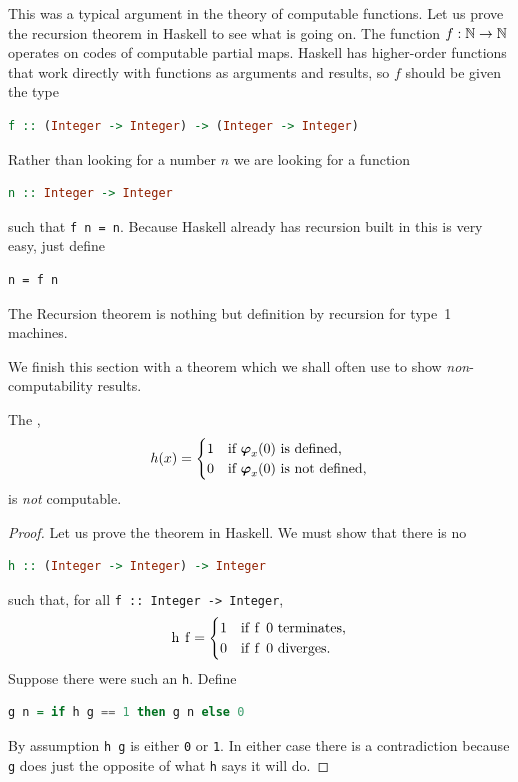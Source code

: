 This was a typical argument in the theory of computable functions. Let
us prove the recursion theorem in Haskell to see what is going on. The
function $f : \mathbb{N} \to \mathbb{N}$ operates on codes of computable partial
maps. Haskell has higher-order functions that work directly with functions as arguments and results, so $f$ should be given the type
%
\begin{lstlisting}[language=Haskell]
f :: (Integer -> Integer) -> (Integer -> Integer)
\end{lstlisting}
%
Rather than looking for a number $n$ we are looking for a function
%
\begin{lstlisting}[language=Haskell]
n :: Integer -> Integer
\end{lstlisting}
%
such that \lstinline!f n = n!. Because Haskell already has recursion built in this is very easy, just define
%
\begin{lstlisting}
n = f n
\end{lstlisting}
%
The Recursion theorem is nothing but definition by recursion for type~1 machines.

We finish this section with a theorem which we shall often use to show
\emph{non}-computability results.

\begin{theorem}
  The ,
  \begin{equation*}
    h(x) =
    \begin{cases}
      1 & \text{if $\text{\boldmath{$\varphi$}}_{x}(0)$ is defined,}\\
      0 & \text{if $\text{\boldmath{$\varphi$}}_{x}(0)$ is not defined,}
    \end{cases}
  \end{equation*}
  is \emph{not} computable.
\end{theorem}

\begin{proof}
  Let us prove the theorem in Haskell. We must show that there is no
\begin{lstlisting}[language=Haskell]
h :: (Integer -> Integer) -> Integer
\end{lstlisting}
  such that, for all \lstinline!f :: Integer -> Integer!,
  \begin{equation*}
    \text{\lstinline!h f!} =
    \begin{cases}
      \text{\lstinline!1!} & \text{if \lstinline!f 0! terminates,}\\
      \text{\lstinline!0!} & \text{if \lstinline!f 0! diverges.}
    \end{cases}
  \end{equation*}
  Suppose there were such an \lstinline!h!. Define
\begin{lstlisting}[language=Haskell]
g n = if h g == 1 then g n else 0
\end{lstlisting}
  By assumption \lstinline!h g! is either \lstinline!0! or
  \lstinline!1!. In either case there is a contradiction because
  \lstinline!g! does just the opposite of what \lstinline!h! says it
  will do.
\end{proof}

